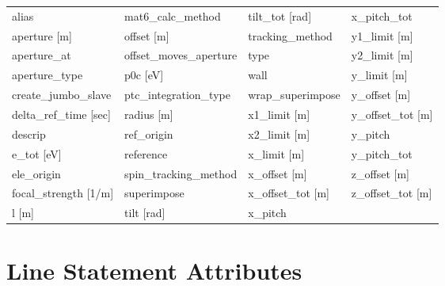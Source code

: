  \begin{tabular}{llll} \toprule
alias                            & mat6_calc_method                 & tilt_tot [rad]                   & x_pitch_tot                      \\
aperture [m]                     & offset [m]                       & tracking_method                  & y1_limit [m]                     \\
aperture_at                      & offset_moves_aperture            & type                             & y2_limit [m]                     \\
aperture_type                    & p0c [eV]                         & wall                             & y_limit [m]                      \\
create_jumbo_slave               & ptc_integration_type             & wrap_superimpose                 & y_offset [m]                     \\
delta_ref_time [sec]             & radius [m]                       & x1_limit [m]                     & y_offset_tot [m]                 \\
descrip                          & ref_origin                       & x2_limit [m]                     & y_pitch                          \\
e_tot [eV]                       & reference                        & x_limit [m]                      & y_pitch_tot                      \\
ele_origin                       & spin_tracking_method             & x_offset [m]                     & z_offset [m]                     \\
focal_strength [1/m]             & superimpose                      & x_offset_tot [m]                 & z_offset_tot [m]                 \\
l [m]                            & tilt [rad]                       & x_pitch                          &                                  \\
 \bottomrule
 \end{tabular}
 \vfill
 
 \section{Line Statement Attributes}
 \label{s:list.line}
 

